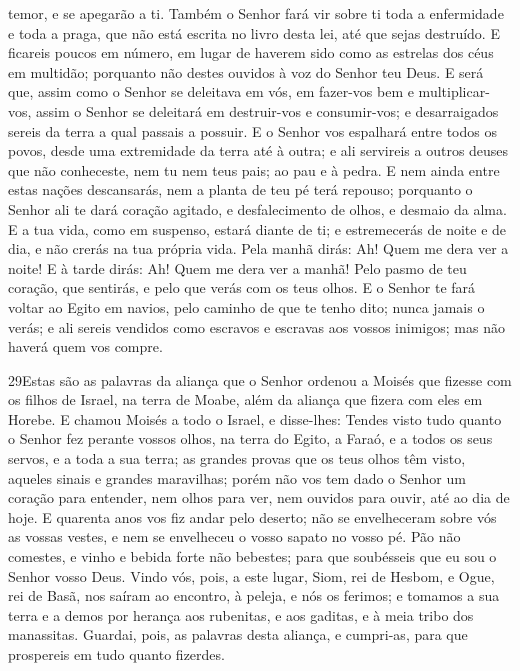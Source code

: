 temor, e se apegarão a ti. Também o Senhor fará vir sobre ti
toda a enfermidade e toda a praga, que não está escrita no livro
desta lei, até que sejas destruído. E ficareis poucos em
número, em lugar de haverem sido como as estrelas dos céus em
multidão; porquanto não destes ouvidos à voz do Senhor teu Deus.
E será que, assim como o Senhor se deleitava em vós, em
fazer-vos bem e multiplicar-vos, assim o Senhor se deleitará em
destruir-vos e consumir-vos; e desarraigados sereis da terra a qual
passais a possuir. E o Senhor vos espalhará entre todos os
povos, desde uma extremidade da terra até à outra; e ali servireis a
outros deuses que não conheceste, nem tu nem teus pais; ao pau e à
pedra. E nem ainda entre estas nações descansarás, nem a
planta de teu pé terá repouso; porquanto o Senhor ali te dará
coração agitado, e desfalecimento de olhos, e desmaio da alma.
E a tua vida, como em suspenso, estará diante de ti; e
estremecerás de noite e de dia, e não crerás na tua própria vida.
Pela manhã dirás: Ah! Quem me dera ver a noite! E à tarde
dirás: Ah! Quem me dera ver a manhã! Pelo pasmo de teu coração, que
sentirás, e pelo que verás com os teus olhos. E o Senhor te
fará voltar ao Egito em navios, pelo caminho de que te tenho dito;
nunca jamais o verás; e ali sereis vendidos como escravos e escravas
aos vossos inimigos; mas não haverá quem vos compre.

\medskip

\lettrine{29} Estas são as palavras da aliança que o Senhor
ordenou a Moisés que fizesse com os filhos de Israel, na terra de
Moabe, além da aliança que fizera com eles em Horebe. E chamou
Moisés a todo o Israel, e disse-lhes: Tendes visto tudo quanto o
Senhor fez perante vossos olhos, na terra do Egito, a Faraó, e a
todos os seus servos, e a toda a sua terra; as grandes provas
que os teus olhos têm visto, aqueles sinais e grandes maravilhas;
porém não vos tem dado o Senhor um coração para entender, nem
olhos para ver, nem ouvidos para ouvir, até ao dia de hoje. E
quarenta anos vos fiz andar pelo deserto; não se envelheceram sobre
vós as vossas vestes, e nem se envelheceu o vosso sapato no vosso
pé. Pão não comestes, e vinho e bebida forte não bebestes; para
que soubésseis que eu sou o Senhor vosso Deus. Vindo vós, pois,
a este lugar, Siom, rei de Hesbom, e Ogue, rei de Basã, nos saíram
ao encontro, à peleja, e nós os ferimos; e tomamos a sua terra e
a demos por herança aos rubenitas, e aos gaditas, e à meia tribo dos
manassitas. Guardai, pois, as palavras desta aliança, e
cumpri-as, para que prospereis em tudo quanto fizerdes.

